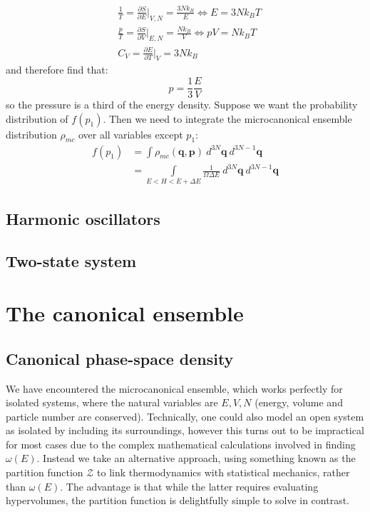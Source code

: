 \documentclass[a4paper,11pt,oneside]{book}
\begin{document}
\begin{align}
    &\frac{1}{T} = \frac{\partial S}{\partial E}\bigg|_{V,N}=\frac{3Nk_B}{E} \iff E = 3Nk_B T\\
    &\frac{p}{T} = \frac{\partial S}{\partial V}\bigg|_{E,N} = \frac{Nk_B}{V} \iff pV = Nk_B T\\
    &C_V = \frac{\partial E}{\partial T}\bigg|_V = 3Nk_B
\end{align}
and therefore find that:
\begin{equation}
    p=\frac{1}{3}\frac{E}{V} 
\end{equation}
so the pressure is a third of the energy density. 
Suppose we want the probability distribution of $f(p_1)$. Then we need to integrate the microcanonical ensemble distribution $\rho_{mc}$ over all variables except $p_1$:
\begin{align}
f(p_1) &= \int \rho_{mc}(\textbf{q},\textbf{p})\ d^{3N} \textbf{q}\ d^{3N-1} \textbf{q}\\
&= \int \limits _{E<H<E+\Delta E} \frac{1}{\Omega \Delta E}\ d^{3N} \textbf{q}\ d^{3N-1} \textbf{q}
\end{align}
\section{Harmonic oscillators}

\section{Two-state system}
\chapter{The canonical ensemble}
\section{Canonical phase-space density}
We have encountered the microcanonical ensemble, which works perfectly for isolated systems, where the natural variables are $E,V,N$ (energy, volume and particle number are conserved). Technically, one could also model an open system as isolated by including its surroundings, however this turns out to be impractical for most cases due to the complex mathematical calculations involved in finding $\omega(E)$. Instead we take an alternative approach, using something known as the partition function $\mathcal{Z}$ to link thermodynamics with statistical mechanics, rather than $\omega(E)$. The advantage is that while the latter requires evaluating hypervolumes, the partition function is delightfully simple to solve in contrast. 
\end{document}
